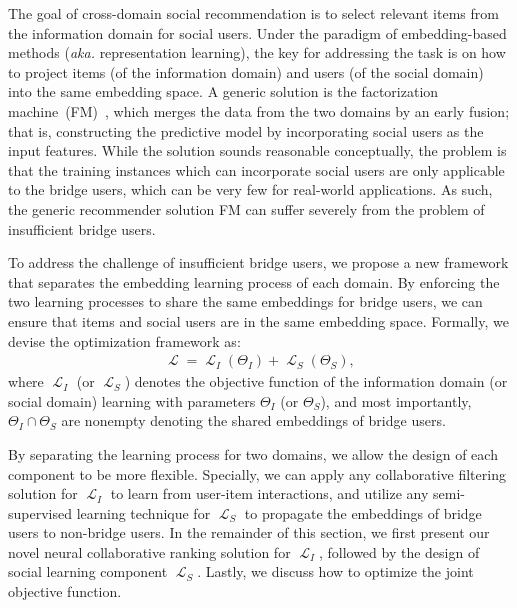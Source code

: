 \documentclass[sigconf]{acmart}
\newcommand{\Lapl}{\mathbf{\mathop{\mathcal{L}}}}
\newcommand{\aka}{\emph{aka. }}
\begin{document}
The goal of cross-domain social recommendation is to select relevant items from the information domain for social users. Under the paradigm of embedding-based methods (\aka representation learning), the key for addressing the task is on how to project items (of the information domain) and users (of the social domain) into the same embedding space.
A generic solution is the factorization machine~(FM)~\cite{DBLP:conf/uai/RendleFGS09,DBLP:journals/tist/Rendle12}, which merges the data from the two domains by an early fusion; that is, constructing the predictive model by incorporating social users as the input features.
While the solution sounds reasonable conceptually, the problem is that the training instances which can incorporate social users are only applicable to the bridge users, which can be very few for real-world applications. As such, the generic recommender solution FM can suffer severely from the problem of insufficient bridge users.

To address the challenge of insufficient bridge users, we propose a new framework that separates the embedding learning process of each domain.
By enforcing the two learning processes to share the same embeddings for bridge users, we can ensure that items and social users are in the same embedding space.
Formally, we devise the optimization framework as:
\begin{gather}\label{equ:framework}
\Lapl = \Lapl_{I} (\Theta_I) + \Lapl_{S}(\Theta_S),
\end{gather}
where $\Lapl_{I}$ (or $\Lapl_{S}$) denotes the objective function of the information domain (or social domain) learning with parameters $\Theta_I$ (or $\Theta_S$), and most importantly, $\Theta_I \cap \Theta_S$ are nonempty denoting the shared embeddings of bridge users.

By separating the learning process for two domains, we allow the design of each component to be more flexible. Specially, we can apply any collaborative filtering solution for $\Lapl_I$ to learn from user-item interactions, and utilize any semi-supervised learning technique for $\Lapl_S$ to propagate the embeddings of bridge users to non-bridge users.
In the remainder of this section, we first present our novel neural collaborative ranking solution for $\Lapl_I$, followed by the design of social learning component $\Lapl_S$. Lastly, we discuss how to optimize the joint objective function.
\end{document}
